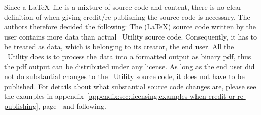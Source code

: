 	\begin{daInfoBox}
		Since a \LaTeX~file is a mixture of source code and content, there is no clear definition of when giving credit/re-publishing the source code is necessary. The authors therefore decided the following: The (\LaTeX) source code written by the user contains more data than actual \productName~Utility source code. Consequently, it has to be treated as data, which is belonging to its creator, the end user. All the \mbox{\productName}~Utility does is to process the data into a formatted output as binary pdf, thus the pdf output can be distributed under any license. As long as the end user did not do substantial changes to the \productName~Utility source code, it does not have to be published. For details about what substantial source code changes are, please see the examples in \mbox{appendix \ref{appendix:sec:licensing:examples-when-credit-or-re-publishing}}, \mbox{page \pageref{appendix:sec:licensing:examples-when-credit-or-re-publishing}} and following. 
	\end{daInfoBox}

	